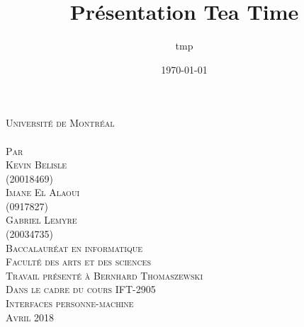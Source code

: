 \documentclass[a4paper,12pt]{article}
\date{\today}
\title{Présentation Tea Time}
\author{tmp}
\newcommand{\Author}{Kevin Belisle}
\newcommand{\Teacher}{Bernhard Thomaszewski}
\newcommand{\ClassNum}{IFT-2905}
\newcommand{\ClassName}{Interfaces personne-machine}
\newcommand{\DateMMMMYYYY}{Avril 2018}
\begin{document}
	\begin{titlepage} 
		\begin{center}
			\textsc{\normalsize Université de Montréal}\\[2.5cm]
			
			\textsc{\LARGE \@title}\\[2.5cm]
			
			\textsc{\small Par}\\[0.25cm]
			\textsc{\LARGE \Author}\\[0.25cm]
			\textsc{\normalsize (20018469)}\\[0.25cm]
			\textsc{\LARGE Imane El Alaoui}\\[0.25cm]
			\textsc{\normalsize (0917827)}\\[0.25cm]
			\textsc{\LARGE Gabriel Lemyre}\\[0.25cm]
			\textsc{\normalsize (20034735)}\\[2cm]
			
			\textsc{\normalsize Baccalauréat en informatique}\\
			\textsc{\normalsize Faculté des arts et des sciences}\\[2cm]
			
			\textsc{\small Travail présenté à \Teacher}\\
			\textsc{\small Dans le cadre du cours \ClassNum}\\
			\textsc{\small \ClassName}\\[2cm]
			
			\textsc{\normalsize \DateMMMMYYYY}\\[1cm]
		\end{center}
	\end{titlepage}
\end{document}
